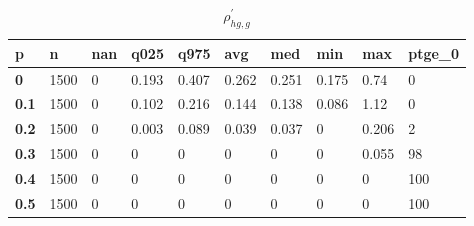\begin{table}[h]
 \centering 
\footnotesize
\caption{$\rho_{hg,g}^\prime $}
\label{tab:alphahgg}
\begin{tabular}[h]{|l|l|l|l|l|l|l|l|l|l|
    } \hline
\textbf{ p} & \textbf{ n} & \textbf{ nan} & \textbf{ q025} & \textbf{ q975} & \textbf{ avg} & \textbf{ med} & \textbf{ min} & \textbf{ max} & \textbf{ ptge\_0}
    \\ \hline
  \textbf{  0} & 1500 & 0 & 0.193 & 0.407 & 0.262 & 0.251 & 0.175 &  0.74 &   0
    \\ \hline
  \textbf{0.1} & 1500 & 0 & 0.102 & 0.216 & 0.144 & 0.138 & 0.086 &  1.12 &   0
    \\ \hline
  \textbf{0.2} & 1500 & 0 & 0.003 & 0.089 & 0.039 & 0.037 &     0 & 0.206 &   2
    \\ \hline
  \textbf{0.3} & 1500 & 0 &     0 &     0 &     0 &     0 &     0 & 0.055 &  98
    \\ \hline
  \textbf{0.4} & 1500 & 0 &     0 &     0 &     0 &     0 &     0 &     0 & 100
    \\ \hline
  \textbf{0.5} & 1500 & 0 &     0 &     0 &     0 &     0 &     0 &     0 & 100
    \\ \hline
 \end{tabular}
 \end{table}
